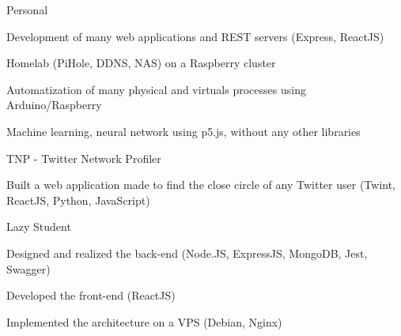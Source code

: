 
\begin{cventries}
  \cventry
    {} %
    {Personal} %
    {} %
    {} %
    {
      \begin{cvitems} %
        \item {Development of many web applications and REST servers (Express, ReactJS)}
        \item {Homelab (PiHole, DDNS, NAS) on a Raspberry cluster}
		\item {Automatization of many physical and virtuals processes using Arduino/Raspberry}
        \item {Machine learning, neural network using p5.js, without any other libraries}
      \end{cvitems}
    }

  \cventry
    {} %
    {TNP - Twitter Network Profiler} %
    {} %
    {} %
    {
      \begin{cvitems} %
      	\item {Built a web application made to find the close circle of any Twitter user (Twint, ReactJS, Python, JavaScript)}
      \end{cvitems}
    }

  \cventry
    {} %
    {Lazy Student} %
    {} %
    {} %
    {
      \begin{cvitems} %
      	\item {Designed and realized the back-end (Node.JS, ExpressJS, MongoDB, Jest, Swagger)}
		\item {Developed the front-end (ReactJS)}
		\item {Implemented the architecture on a VPS (Debian, Nginx)}
      \end{cvitems}
    }
\end{cventries}